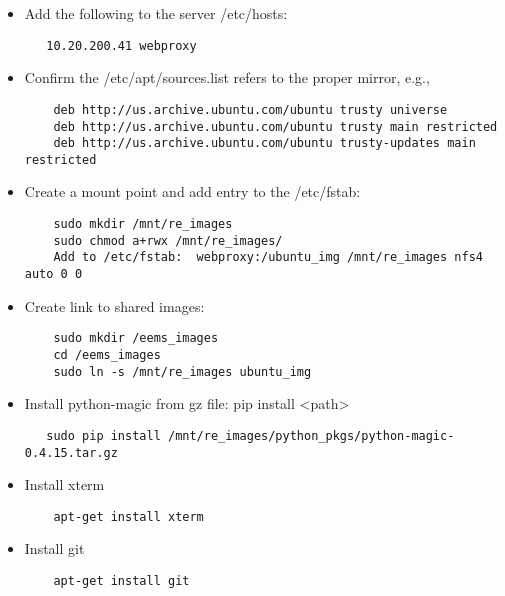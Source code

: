 \documentclass[titlepage]{article}
\begin{document}
\begin{itemize}
\item Add the following to the server /etc/hosts:
\begin{verbatim}
   10.20.200.41 webproxy
\end{verbatim}


\item Confirm the /etc/apt/sources.list refers to the proper mirror, e.g., 
\begin{verbatim}
    deb http://us.archive.ubuntu.com/ubuntu trusty universe
    deb http://us.archive.ubuntu.com/ubuntu trusty main restricted
    deb http://us.archive.ubuntu.com/ubuntu trusty-updates main restricted
\end{verbatim}


\item Create a mount point and add entry to the /etc/fstab:
\begin{verbatim}
    sudo mkdir /mnt/re_images
    sudo chmod a+rwx /mnt/re_images/
    Add to /etc/fstab:  webproxy:/ubuntu_img /mnt/re_images nfs4 auto 0 0
\end{verbatim}

\item Create link to shared images:
\begin{verbatim}
    sudo mkdir /eems_images
    cd /eems_images
    sudo ln -s /mnt/re_images ubuntu_img
\end{verbatim}


\item Install python-magic from gz file:  pip install <path>
\begin{verbatim}
   sudo pip install /mnt/re_images/python_pkgs/python-magic-0.4.15.tar.gz
\end{verbatim}

\item Install xterm
\begin{verbatim}
    apt-get install xterm
\end{verbatim}

\item Install git
\begin{verbatim}
    apt-get install git
\end{verbatim}
\end{itemize}
\end{document}
